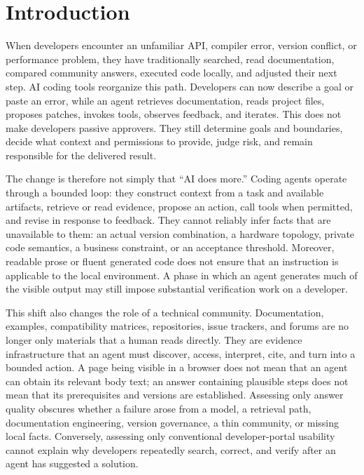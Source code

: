 \documentclass[manuscript,review,anonymous]{acmart}
\begin{document}
\maketitle

\section{Introduction}

When developers encounter an unfamiliar API, compiler error, version conflict, or performance problem, they have traditionally searched, read documentation, compared community answers, executed code locally, and adjusted their next step. AI coding tools reorganize this path. Developers can now describe a goal or paste an error, while an agent retrieves documentation, reads project files, proposes patches, invokes tools, observes feedback, and iterates. This does not make developers passive approvers. They still determine goals and boundaries, decide what context and permissions to provide, judge risk, and remain responsible for the delivered result.

The change is therefore not simply that ``AI does more.'' Coding agents operate through a bounded loop: they construct context from a task and available artifacts, retrieve or read evidence, propose an action, call tools when permitted, and revise in response to feedback. They cannot reliably infer facts that are unavailable to them: an actual version combination, a hardware topology, private code semantics, a business constraint, or an acceptance threshold. Moreover, readable prose or fluent generated code does not ensure that an instruction is applicable to the local environment. A phase in which an agent generates much of the visible output may still impose substantial verification work on a developer.

This shift also changes the role of a technical community. Documentation, examples, compatibility matrices, repositories, issue trackers, and forums are no longer only materials that a human reads directly. They are evidence infrastructure that an agent must discover, access, interpret, cite, and turn into a bounded action. A page being visible in a browser does not mean that an agent can obtain its relevant body text; an answer containing plausible steps does not mean that its prerequisites and versions are established. Assessing only answer quality obscures whether a failure arose from a model, a retrieval path, documentation engineering, version governance, a thin community, or missing local facts. Conversely, assessing only conventional developer-portal usability cannot explain why developers repeatedly search, correct, and verify after an agent has suggested a solution.
\end{document}
